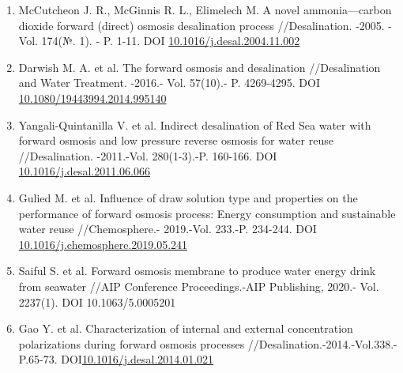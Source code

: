 \begin{references}
\begin{enumerate}
\def\labelenumi{\arabic{enumi}.}
\setcounter{enumi}{13}
\item
  McCutcheon J. R., McGinnis R. L., Elimelech M. A novel
  ammonia---carbon dioxide forward (direct) osmosis desalination process
  //Desalination. -2005. - Vol. 174(№. 1). - P. 1-11. DOI
  \href{http://dx.doi.org/10.1016/j.desal.2004.11.002}{10.1016/j.desal.2004.11.002}
\item
  Darwish M. A. et al. The forward osmosis and desalination
  //Desalination and Water Treatment. -2016.- Vol. 57(10).- P.
  4269-4295. DOI
  \href{http://dx.doi.org/10.1080/19443994.2014.995140}{10.1080/19443994.2014.995140}
\item
  Yangali-Quintanilla V. et al. Indirect desalination of Red Sea water
  with forward osmosis and low pressure reverse osmosis for water reuse
  //Desalination. -2011.-Vol. 280(1-3).-P. 160-166. DOI
  \href{http://dx.doi.org/10.1016/j.desal.2011.06.066}{10.1016/j.desal.2011.06.066}
\item
  Gulied M. et al. Influence of draw solution type and properties on the
  performance of forward osmosis process: Energy consumption and
  sustainable water reuse //Chemosphere.- 2019.-Vol. 233.-P. 234-244.
  DOI
  \href{http://dx.doi.org/10.1016/j.chemosphere.2019.05.241}{10.1016/j.chemosphere.2019.05.241}
\item
  Saiful S. et al. Forward osmosis membrane to produce water energy
  drink from seawater //AIP Conference Proceedings.-AIP Publishing,
  2020.- Vol. 2237(1). DOI 10.1063/5.0005201
\item
  Gao Y. et al. Characterization of internal and external concentration
  polarizations during forward osmosis processes
  //Desalination.-2014.-Vol.338.- P.65-73.
  DOI\href{http://dx.doi.org/10.1016/j.desal.2014.01.021}{10.1016/j.desal.2014.01.021}
\end{enumerate}
\end{references}


